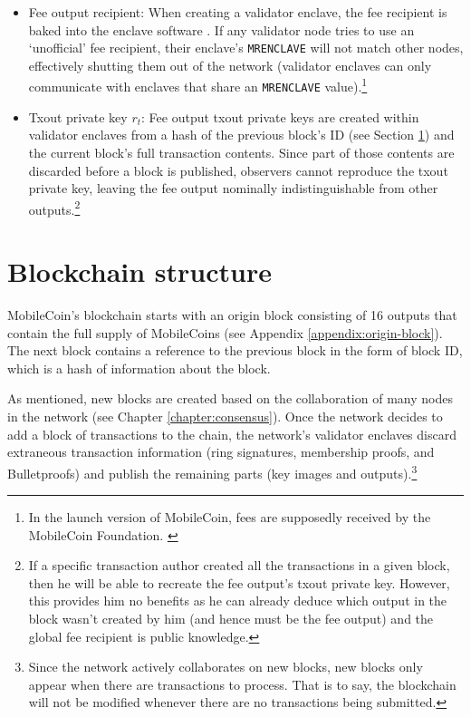 \begin{itemize}
    \item Fee output recipient: When creating a validator enclave, the fee recipient is baked into the enclave software \cite{mc-pull-request-fee-key-build-input}. If any validator node tries to use an `unofficial' fee recipient, their enclave's {\tt MRENCLAVE} will not match other nodes, effectively shutting them out of the network (validator enclaves can only communicate with enclaves that share an {\tt MRENCLAVE} value).\footnote{In the launch version of MobileCoin, fees are supposedly received by the MobileCoin Foundation. \cite{mobilecoin-governance-fees-supply}}

    \item Txout private key $r_t$: Fee output txout private keys are created within validator enclaves from a hash of the previous block's ID (see Section \ref{sec:blockchain-structure}) and the current block's full transaction contents. Since part of those contents are discarded before a block is published, observers cannot reproduce the txout private key, leaving the fee output nominally indistinguishable from other outputs.\footnote{If a specific transaction author created all the transactions in a given block, then he will be able to recreate the fee output's txout private key. However, this provides him no benefits as he can already deduce which output in the block wasn't created by him (and hence must be the fee output) and the global fee recipient is public knowledge.}
\end{itemize}



\section{Blockchain structure}
\label{sec:blockchain-structure}

MobileCoin's blockchain starts with an origin block consisting of 16 outputs that contain the full supply of MobileCoins (see Appendix \ref{appendix:origin-block}). The next block contains a reference to the previous block in the form of block ID, which is a hash of information about the block.

As mentioned, new blocks are created based on the collaboration of many nodes in the network (see Chapter \ref{chapter:consensus}). Once the network decides to add a block of transactions to the chain, the network's validator enclaves discard extraneous transaction information (ring signatures, membership proofs, and Bulletproofs) and publish the remaining parts (key images and outputs).\footnote{Since the network actively collaborates on new blocks, new blocks only appear when there are transactions to process. That is to say, the blockchain will not be modified whenever there are no transactions being submitted.}

